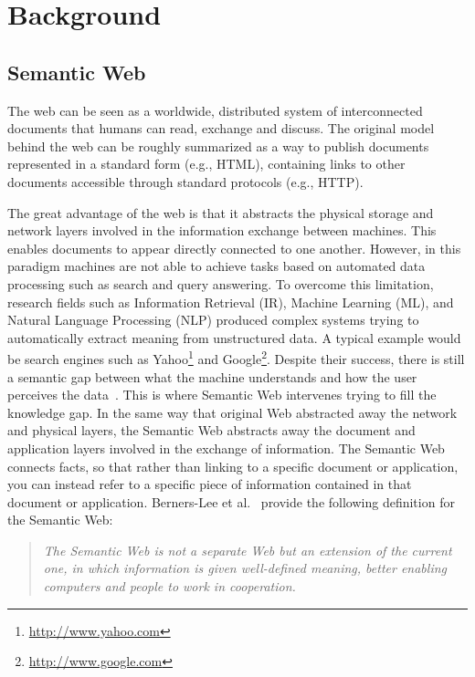 \chapter{Background} \label{chapter:part1-background}
\graphicspath{{Part1/Background/figures/}}

\section{Semantic Web} \label{section:sematic-web}

The web can be seen as a worldwide, distributed system of interconnected documents that humans can read, exchange and discuss. The original model behind the web can be roughly summarized as a way to publish documents represented in a standard form (e.g., HTML), containing links to other documents accessible through standard protocols (e.g., HTTP).

The great advantage of the web is that it abstracts the physical storage and network layers involved in the information exchange between machines. This enables documents to appear directly connected to one another. However, in this paradigm machines are not able to achieve tasks based on automated data processing such as search and query answering. To overcome this limitation, research fields such as Information Retrieval (IR), Machine Learning (ML), and Natural Language Processing (NLP) produced complex systems trying to automatically extract meaning from unstructured data. A typical example would be search engines such as Yahoo\footnote{\url{http://www.yahoo.com}} and Google\footnote{\url{http://www.google.com}}. Despite their success, there is still a semantic gap between what the machine understands and how the user perceives the data~\cite{Mika:book:07}. This is where Semantic Web intervenes trying to fill the knowledge gap. In the same way that original Web abstracted away the network and physical layers, the Semantic Web abstracts away the document and application layers involved in the exchange of information. The Semantic Web connects facts, so that rather than linking to a specific document or application, you can instead refer to a specific piece of information contained in that document or application. Berners-Lee et al.~\cite{BernersLee:ScientificAmerican:01} provide the following definition for the Semantic Web:

\begin{quote}
	\emph{The Semantic Web is not a separate Web but an extension of the current one, in which information is given well-defined meaning, better enabling computers and people to work in cooperation.}
\end{quote}

